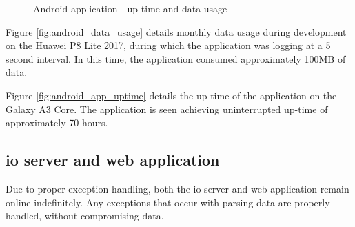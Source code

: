 \begin{figure}[H]
\centering
\caption{Android application - up time and data usage}
\label{fig:performance}
\end{figure}

Figure \ref{fig:android_data_usage} details monthly data usage during development on the Huawei P8 Lite 2017, during which the application was logging at a 5 second interval.
In this time, the application consumed approximately 100MB of data.

Figure \ref{fig:android_app_uptime} details the up-time of the application on the Galaxy A3 Core.
The application is seen achieving uninterrupted up-time of approximately 70 hours.

\subsection{\Ac{io} server and web application}
Due to proper exception handling, both the \ac{io} server and web application remain online indefinitely.
Any exceptions that occur with parsing data are properly handled, without compromising data.

\pagebreak
